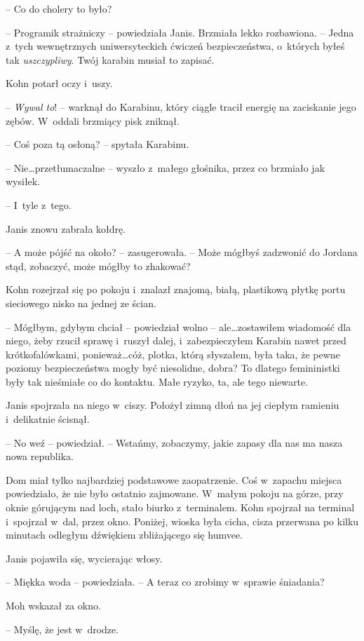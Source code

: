 \documentclass[oneside,polish,11pt,sfheadings]{mwbk}
\begin{document}
-- Co do cholery to było?

-- Programik strażniczy -- powiedziała Janis. Brzmiała lekko rozbawiona. -- Jedna z~tych wewnętrznych uniwersyteckich ćwiczeń bezpieczeństwa, o~których byłeś tak \emph{uszczypliwy}. Twój karabin musiał to zapisać.

Kohn potarł oczy i~uszy. 

-- \emph{Wywal to}! -- warknął do Karabinu, który
ciągle tracił energię na zaciskanie jego zębów. W~oddali brzmiący pisk
zniknął.

-- Coś poza tą osłoną? -- spytała Karabinu.

-- Nie\ldots przetłumaczalne -- wyszło z~małego głośnika, przez co brzmiało
jak wysiłek.

-- I~tyle z~tego.

Janis znowu zabrała kołdrę. 

-- A może pójść na około? -- zasugerowała. -- Może mógłbyś zadzwonić do Jordana stąd, zobaczyć, może mógłby to
zhakować?

Kohn rozejrzał się po pokoju i~znalazł znajomą, białą, plastikową płytkę
portu sieciowego nisko na jednej ze ścian. 

-- Mógłbym, gdybym chciał -- powiedział wolno -- ale\ldots zostawiłem wiadomość dla niego, żeby rzucił
sprawę i~ruszył dalej, i~zabezpieczyłem Karabin nawet przed
krótkofalówkami, ponieważ\ldots cóż, plotka, którą słyszałem, była taka, że
pewne poziomy bezpieczeństwa mogły być niesolidne, dobra? To dlatego
femininistki były tak nieśmiałe co do kontaktu. Małe ryzyko, ta, ale
tego niewarte.

Janis spojrzała na niego w~ciszy. Położył zimną dłoń na jej ciepłym
ramieniu i~delikatnie ścisnął.

-- No weź -- powiedział. -- Wstańmy, zobaczymy, jakie zapasy dla nas ma
nasza nowa republika.

Dom miał tylko najbardziej podstawowe zaopatrzenie. Coś w~zapachu
miejsca powiedziało, że nie było ostatnio zajmowane. W~małym pokoju na
górze, przy oknie górującym nad loch, stało biurko z~terminalem. Kohn
spojrzał na terminal i~spojrzał w~dal, przez okno. Poniżej, wioska była
cicha, cisza przerwana po kilku minutach odległym dźwiękiem zbliżającego
się humvee.

Janis pojawiła się, wycierając włosy.

-- Miękka woda -- powiedziała. -- A teraz co zrobimy w~sprawie śniadania?

Moh wskazał za okno. 

-- Myślę, że jest w~drodze.
\end{document}
